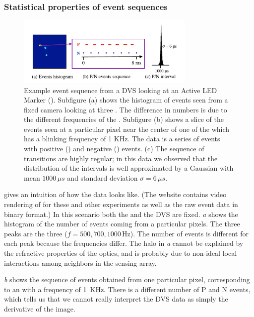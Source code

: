 \subsubsection{Statistical properties of event sequences}

\begin{figure}[b]
\begin{centering}
\includegraphics[width=8.6cm]{figures/slides/event_sequence}
\par\end{centering}

\caption{\label{fig:events-hist}Example event sequence from a DVS looking
at an Active LED Marker (\ALM). Subfigure (a) shows the histogram
of events seen from a fixed camera looking at three \ALMs. The difference
in numbers is due to the different frequencies of the \ALMs. Subfigure
(b) shows a slice of the events seen at a particular pixel near the
center of one of the \ALMs which has a blinking frequency of 1 KHz.
The data is a series of events with positive (\pP) and negative (\pN)
events. (c) The sequence of \pPN transitions are highly regular;
in this data we observed that the distribution of the intervals is
well approximated by a Gaussian with mean $1000\,\mu s$ and standard
deviation $\sigma=6\,\mu s$. }
\end{figure}


 gives an intuition of how the data looks
like. (The website \xxx contains video rendering of for these and
other experiments as well as the raw event data in binary format.)
In this scenario both the \ALMs and the DVS are fixed. \emph{a}
shows the histogram of the number of events coming from a particular
pixels. The three peaks are the three \ALMs ($f=500,700,1000\,\mbox{Hz}$).
The number of events is different for each peak because the frequencies
differ. The halo in \emph{a} cannot be
explained by the refractive properties of the optics, and is probably
due to non-ideal local interactions among neighbors in the sensing
array.

\emph{b} shows the sequence of events
obtained from one particular pixel, corresponding to an \ALM  with
a frequency of 1~KHz. There is a different number of P and N events,
which tells us that we cannot really interpret the DVS data as simply
the derivative of the image. 

